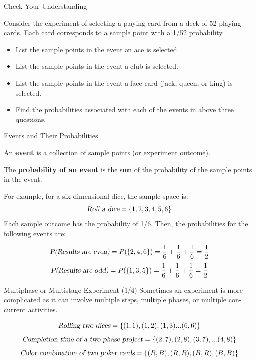 \documentclass{beamer}
\begin{document}
\begin{frame}{Check Your Understanding}

Consider the experiment of selecting a playing card from a deck of 52 playing cards. Each card corresponds to a sample point with a 1/52 probability.

\begin{itemize}
\item List the sample points in the event an ace is selected.
\item List the sample points in the event a club is selected.
\item List the sample points in the event a face card (jack, queen, or king) is selected.
\item Find the probabilities associated with each of the events in above three questions.
\end{itemize}



\end{frame}




\begin{frame}{Events and Their Probabilities}

An \textbf{event} is a collection of sample points (or experiment outcome).

\vspace{0.3 cm}

The \textbf{probability of an event} is the sum of the probability of the sample points in the event.

\vspace{0.3 cm}

For example, for a six-dimensional dice, the sample space is:
$$\textsl{Roll a dice} = \lbrace 1, 2, 3, 4, 5, 6 \rbrace$$
Each sample outcome has the probability of 1/6. Then, the probabilities for the following events are:

$$ \textsl{P(Results are even)} = P(\lbrace 2, 4, 6 \rbrace) = \frac{1}{6} + \frac{1}{6} + \frac{1}{6} = \frac{1}{2}   $$
$$ \textsl{P(Results are odd)} = P(\lbrace 1, 3, 5 \rbrace) = \frac{1}{6} + \frac{1}{6} + \frac{1}{6} = \frac{1}{2}  $$


\end{frame}

\begin{frame}{Multiphase or Multistage Experiment (1/4)}
Sometimes an experiment is more complicated as it can involve multiple steps, multiple phases, or multiple con-current activities.

$$\textsl{Rolling two dices} = \lbrace (1, 1), (1, 2), (1, 3) ... (6, 6) \rbrace $$
$$\textsl{Completion time of a two-phase project} = \lbrace (2, 7), (2, 8), (3, 7), ... (4, 8) \rbrace $$
$$\textsl{Color combination of two poker cards} = \lbrace (R, B), (R, R), (B, R), (B, B) \rbrace $$

\end{frame}
\end{document}
